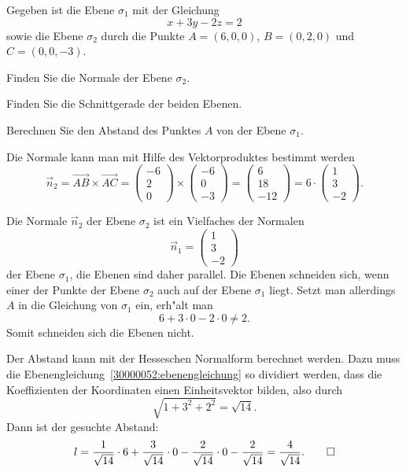 Gegeben ist die Ebene $\sigma_1$ mit der Gleichung
\begin{equation}
x+3y-2z=2
\label{30000052:ebenengleichung}
\end{equation}
sowie die Ebene $\sigma_2$ durch die Punkte $A=(6,0,0)$, $B=(0,2,0)$ und
$C=(0,0,-3)$.
\begin{teilaufgaben}
\item
Finden Sie die Normale der Ebene $\sigma_2$.
\item 
Finden Sie die Schnittgerade der beiden Ebenen.
\item 
Berechnen Sie den Abstand des Punktes $A$ von der Ebene $\sigma_1$.
\end{teilaufgaben}

\begin{loesung}
\begin{teilaufgaben}
\item
Die Normale kann man mit Hilfe des Vektorproduktes bestimmt werden
\[
\vec{n}_2
=
\overrightarrow{AB}\times\overrightarrow{AC}
=
\begin{pmatrix}
-6\\
 2\\
 0
\end{pmatrix}
\times
\begin{pmatrix}
-6\\
 0\\
-3
\end{pmatrix}
=
\begin{pmatrix}
6\\
18\\
-12
\end{pmatrix}
=
6\cdot\begin{pmatrix}
1\\
3\\
-2
\end{pmatrix}.
\]
\item
Die Normale $\vec{n}_2$ der Ebene $\sigma_2$ ist ein Vielfaches der
Normalen
\[
\vec{n}_1=\begin{pmatrix}1\\3\\-2\end{pmatrix}
\]
der Ebene $\sigma_1$, die Ebenen sind daher parallel.
Die Ebenen schneiden sich, wenn einer der Punkte der Ebene $\sigma_2$ auch
auf der Ebene $\sigma_1$ liegt. 
Setzt man allerdings $A$ in die Gleichung von $\sigma_1$ ein, erh"alt man
\[
6+3\cdot 0-2\cdot 0 \ne 2.
\]
Somit schneiden sich die Ebenen nicht.
\item
Der Abstand kann mit der Hesseschen Normalform berechnet werden.
Dazu muss die Ebenengleichung~\eqref{30000052:ebenengleichung}
so dividiert werden, dass die Koeffizienten der Koordinaten einen
Einheitsvektor bilden, also durch
\[
\sqrt{1+3^2+2^2}=\sqrt{14}.
\]
Dann ist der gesuchte Abstand:
\[
l
=
\frac1{\sqrt{14}}\cdot 6
+\frac3{\sqrt{14}}\cdot 0
-\frac2{\sqrt{14}}\cdot 0
-\frac2{\sqrt{14}}
=
\frac4{\sqrt{14}}.
\qedhere
\]
\end{teilaufgaben}
\end{loesung}



